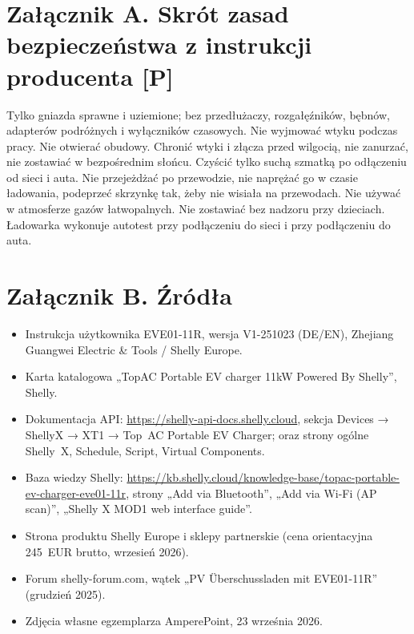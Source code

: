 \documentclass[11pt,a4paper]{article}
\newcommand{\tagP}{\textcolor{apgreen}{\textbf{[P]}}}
\begin{document}
\section*{Załącznik A. Skrót zasad bezpieczeństwa z instrukcji producenta \tagP}

Tylko gniazda sprawne i uziemione; bez przedłużaczy, rozgałęźników, bębnów, adapterów podróżnych i wyłączników czasowych. Nie wyjmować wtyku podczas pracy. Nie otwierać obudowy. Chronić wtyki i złącza przed wilgocią, nie zanurzać, nie zostawiać w bezpośrednim słońcu. Czyścić tylko suchą szmatką po odłączeniu od sieci i auta. Nie przejeżdżać po przewodzie, nie naprężać go w czasie ładowania, podeprzeć skrzynkę tak, żeby nie wisiała na przewodach. Nie używać w atmosferze gazów łatwopalnych. Nie zostawiać bez nadzoru przy dzieciach. Ładowarka wykonuje autotest przy podłączeniu do sieci i przy podłączeniu do auta.

\section*{Załącznik B. Źródła}

\begin{itemize}
\item Instrukcja użytkownika EVE01-11R, wersja V1-251023 (DE/EN), Zhejiang Guangwei Electric \& Tools / Shelly Europe.
\item Karta katalogowa „TopAC Portable EV charger 11kW Powered By Shelly”, Shelly.
\item Dokumentacja API: \url{https://shelly-api-docs.shelly.cloud}, sekcja Devices → ShellyX → XT1 → Top~AC Portable EV Charger; oraz strony ogólne Shelly~X, Schedule, Script, Virtual Components.
\item Baza wiedzy Shelly: \url{https://kb.shelly.cloud/knowledge-base/topac-portable-ev-charger-eve01-11r}, strony „Add via Bluetooth”, „Add via Wi-Fi (AP scan)”, „Shelly X MOD1 web interface guide”.
\item Strona produktu Shelly Europe i sklepy partnerskie (cena orientacyjna 245~EUR brutto, wrzesień 2026).
\item Forum shelly-forum.com, wątek „PV Überschussladen mit EVE01-11R” (grudzień 2025).
\item Zdjęcia własne egzemplarza AmperePoint, 23 września 2026.
\end{itemize}
\end{document}
